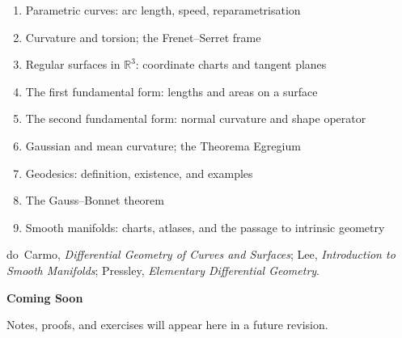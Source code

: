 \begin{enumerate}
  \item Parametric curves: arc length, speed, reparametrisation
  \item Curvature and torsion; the Frenet--Serret frame
  \item Regular surfaces in $\mathbb{R}^3$: coordinate charts
        and tangent planes
  \item The first fundamental form: lengths and areas on a surface
  \item The second fundamental form: normal curvature and shape operator
  \item Gaussian and mean curvature; the Theorema Egregium
  \item Geodesics: definition, existence, and examples
  \item The Gauss--Bonnet theorem
  \item Smooth manifolds: charts, atlases, and the passage to
        intrinsic geometry
\end{enumerate}

\begin{remark*}
do~Carmo, \textit{Differential Geometry of Curves and Surfaces};
Lee, \textit{Introduction to Smooth Manifolds};
Pressley, \textit{Elementary Differential Geometry}.
\end{remark*}

\vspace{1em}
\begin{tcolorbox}[
  colback=gray!6, colframe=gray!40, arc=2pt,
  left=8pt, right=8pt, top=6pt, bottom=6pt,
  title={\small\textbf{Status: Planned}},
  fonttitle=\small\bfseries
]
\begin{center}\Large\bfseries Coming Soon\end{center}
\vspace{6pt}
\noindent Notes, proofs, and exercises will appear here in a future revision.
\end{tcolorbox}

% 
% 
% 
% 
% 
% 
% 
% 
% 
